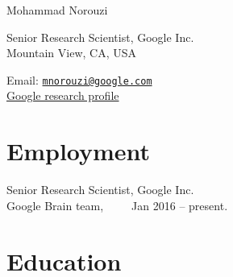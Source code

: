 \documentclass[10pt,letterpaper]{article}
\def\name{Mohammad Norouzi}
\renewenvironment{itemize}{
  \begin{list}{}{
    \setlength{\leftmargin}{1.5em}
  }
}{
  \end{list}
}
\begin{document}
{\huge \name}


\vspace{0.25in}

\begin{minipage}[t]{0.5\textwidth}
  Senior Research Scientist, Google Inc.\\
  Mountain View, CA, USA
\end{minipage}
\begin{minipage}[t]{0.5\textwidth}
  Email: \href{mailto:mnorouzi@google.com}{\tt mnorouzi@google.com} \\
  \href{https://research.google.com/pubs/MohammadNorouzi.html}{Google research profile} \\
\end{minipage}

\section*{Employment}

\begin{itemize}
  \item Senior Research Scientist, Google Inc.\\
    Google Brain team,~~~~~Jan 2016 -- present.
\end{itemize}

\section*{Education}
\end{document}
